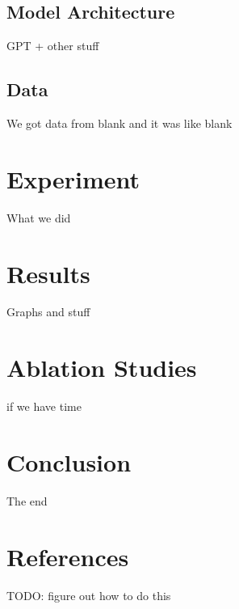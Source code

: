 \documentclass[10pt]{article}
\begin{document}
\subsection{Model Architecture}
GPT + other stuff

\subsection{Data}

We got data from blank and it was like blank

%
% 

\section{Experiment}

What we did

%
% 
\section{Results}

Graphs and stuff

%
% 
\section{Ablation Studies}
if we have time

%
% 
\section{Conclusion}
The end

\section{References}
TODO: figure out how to do this
\end{document}
